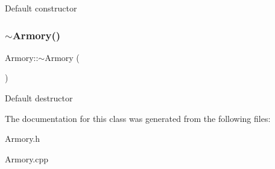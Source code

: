 Default constructor \mbox{\label{classArmory_a4af8efb475734ef6292e5cdef489c9d9}} 
\subsubsection{\texorpdfstring{$\sim$\+Armory()}{~Armory()}}
{\footnotesize\ttfamily Armory\+::$\sim$\+Armory (\begin{DoxyParamCaption}{ }\end{DoxyParamCaption})}

Default destructor 

The documentation for this class was generated from the following files\+:\begin{DoxyCompactItemize}
\item 
Armory.\+h\item 
Armory.\+cpp\end{DoxyCompactItemize}
